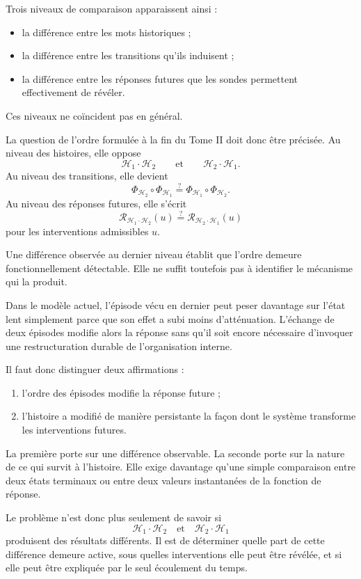 Trois niveaux de comparaison apparaissent ainsi :

\begin{itemize}
\tightlist
\item
  la différence entre les mots historiques ;
\item
  la différence entre les transitions qu'ils induisent ;
\item
  la différence entre les réponses futures que les sondes permettent
  effectivement de révéler.
\end{itemize}

Ces niveaux ne coïncident pas en général.

La question de l'ordre formulée à la fin du Tome II doit donc être précisée. Au niveau des histoires, elle oppose
\[
\mathcal H_1\cdot\mathcal H_2
\qquad\text{et}\qquad
\mathcal H_2\cdot\mathcal H_1.
\]
Au niveau des transitions, elle devient
\[
\Phi_{\mathcal H_2}\circ\Phi_{\mathcal H_1}
\stackrel{?}{=}
\Phi_{\mathcal H_1}\circ\Phi_{\mathcal H_2}.
\]
Au niveau des réponses futures, elle s'écrit
\[
\mathcal R_{\mathcal H_1\cdot\mathcal H_2}(u)
\stackrel{?}{=}
\mathcal R_{\mathcal H_2\cdot\mathcal H_1}(u)
\]
pour les interventions admissibles $u$.

Une différence observée au dernier niveau établit que l'ordre demeure fonctionnellement détectable. Elle ne suffit toutefois pas à identifier le mécanisme qui la produit.

Dans le modèle actuel, l'épisode vécu en dernier peut peser davantage sur l'état lent simplement parce que son effet a subi moins d'atténuation. L'échange de deux épisodes modifie alors la réponse sans qu'il soit encore nécessaire d'invoquer une restructuration durable de l'organisation interne.

Il faut donc distinguer deux affirmations :

\begin{enumerate}
\item
  l'ordre des épisodes modifie la réponse future ;
\item
  l'histoire a modifié de manière persistante la façon dont le système transforme les interventions futures.
\end{enumerate}

La première porte sur une différence observable. La seconde porte sur la nature de ce qui survit à l'histoire. Elle exige davantage qu'une simple comparaison entre deux états terminaux ou entre deux valeurs instantanées de la fonction de réponse.

Le problème n'est donc plus seulement de savoir si
\[
\mathcal H_1\cdot\mathcal H_2
\quad\text{et}\quad
\mathcal H_2\cdot\mathcal H_1
\]
produisent des résultats différents. Il est de déterminer quelle part de cette différence demeure active, sous quelles interventions elle peut être révélée, et si elle peut être expliquée par le seul écoulement du temps.

